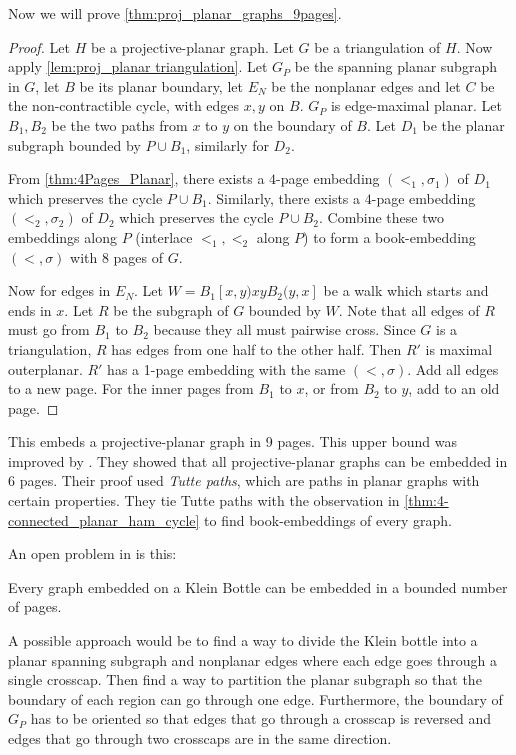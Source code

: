 Now we will prove \cref{thm:proj_planar_graphs_9pages}.
\begin{proof}
    Let $H$ be a projective-planar graph. Let $G$ be a triangulation of $H$.
    Now apply \cref{lem:proj_planar triangulation}. Let $G_P$ be the spanning planar subgraph in $G$, let $B$ be its planar boundary, let $E_N$ be the nonplanar edges and let $C$ be the non-contractible cycle, with edges $x, y$ on $B$. $G_P$ is edge-maximal planar. Let $B_1, B_2$ be the two paths from $x$ to $y$ on the boundary of $B$. Let $D_1$ be the planar subgraph bounded by $P \cup B_1$, similarly for $D_2$. 

    From \cref{thm:4Pages_Planar}, there exists a $4$-page embedding $(<_1, \sigma_1)$ of $D_1$ which preserves the cycle $P \cup B_1$. Similarly, there exists a $4$-page embedding $(<_2, \sigma_2)$ of $D_2$ which preserves the cycle $P \cup B_2$. Combine these two embeddings along $P$ (interlace $<_1, <_2$ along $P$) to form a book-embedding $(<, \sigma)$ with $8$ pages of $G$. 

    Now for edges in $E_N$. Let $W = B_1[x, y) xy B_2(y, x]$ be a walk which starts and ends in $x$. Let $R$ be the subgraph of $G$ bounded by $W$. Note that all edges of $R$ must go from $B_1$ to $B_2$ because they all must pairwise cross. Since $G$ is a triangulation, $R$ has edges from one half to the other half. Then $R'$ is maximal outerplanar. $R'$ has a 1-page embedding with the same $(<, \sigma)$. Add all edges to a new page. For the inner pages from $B_1$ to $x$, or from $B_2$ to $y$, add to an old page. 
\end{proof}

This embeds a projective-planar graph in 9 pages. This upper bound was improved by \textcite{ozekiBookEmbeddingGraphs2019}. They showed that all projective-planar graphs can be embedded in 6 pages. Their proof used \textit{Tutte paths}, which are paths in planar graphs with certain properties. They tie Tutte paths with the observation in \cref{thm:4-connected_planar_ham_cycle} to find book-embeddings of every graph. 

An open problem in \textcite{ozekiBookEmbeddingGraphs2019} is this:
\begin{conjecture}
    Every graph embedded on a Klein Bottle can be embedded in a bounded number of pages.
\end{conjecture}

A possible approach would be to find a way to divide the Klein bottle into a planar spanning subgraph and nonplanar edges where each edge goes through a single crosscap. Then find a way to partition the planar subgraph so that the boundary of each region can go through one edge. Furthermore, the boundary of $G_P$ has to be oriented so that edges that go through a crosscap is reversed and edges that go through two crosscaps are in the same direction. 
